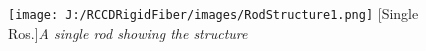 \begin{figure}[H]
\centering
\texttt{[image: J:/RCCDRigidFiber/images/RodStructure1.png]}
[Single Ros.]{\textit{A single rod showing the structure}}
\label{fig:RodStructure}
\end{figure}
